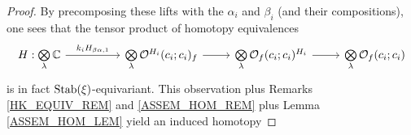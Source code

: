 \documentclass[a4paper,10pt
]{article}%
\renewcommand{\1}{\ensuremath{\mathbb{id}}}
\begin{document}
\begin{proof}
      By precomposing these lifts with the $\alpha_i$ and $\beta_i$ (and their compositions),
      one sees that the tensor product of homotopy equivalences
      \begin{equation}
            \begin{tikzcd}
                  H: \bigotimes\limits_\lambda \mathbb C \arrow[rr, "k_iH_{\beta\alpha,1}"]
                  &&
                  \bigotimes\limits_\lambda \O^{H_i}(c_i;c_i)_f \arrow[r]
                  &
                  \bigotimes\limits_\lambda\O_f(c_i;c_i)^{H_i} \arrow[r]
                  &
                  \bigotimes\limits_\lambda\O_f(c_i;c_i)
            \end{tikzcd}
      \end{equation}
      is in fact $\mathrm{Stab}(\xi)$-equivariant.
      This observation plus
      Remarks \ref{HK_EQUIV_REM} and \ref{ASSEM_HOM_REM} plus Lemma \ref{ASSEM_HOM_LEM}
      yield an induced homotopy

\end{proof}
\end{document}
